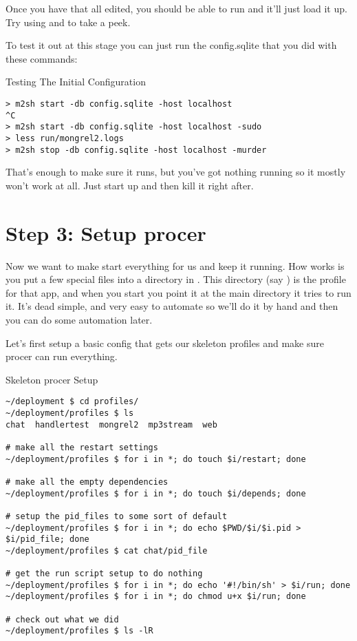 Once you have that all edited, you should be able to run  and it'll just load it up.  Try using
 and  to take a peek.


To test it out at this stage you can just run the config.sqlite that you
did with these commands:

\begin{code}{Testing The Initial Configuration}
\begin{Verbatim}
> m2sh start -db config.sqlite -host localhost
^C
> m2sh start -db config.sqlite -host localhost -sudo
> less run/mongrel2.logs
> m2sh stop -db config.sqlite -host localhost -murder
\end{Verbatim}
\end{code}

That's enough to make sure it runs, but you've got nothing running
so it mostly won't work at all.  Just start up and then kill it
right after.


\section{Step 3: Setup procer}

Now we want to make  start everything for us and keep
it running.  How  works is you put a few special
files into a directory in .  This directory (say )
is the profile for that app, and when you start  you
point it at the main  directory it tries to run it.
It's dead simple, and very easy to automate so we'll do it by hand
and then you can do some automation later.

Let's first setup a basic config that gets our skeleton profiles
and make sure procer can run everything.

\begin{code}{Skeleton procer Setup}
\begin{Verbatim}
~/deployment $ cd profiles/
~/deployment/profiles $ ls
chat  handlertest  mongrel2  mp3stream	web

# make all the restart settings
~/deployment/profiles $ for i in *; do touch $i/restart; done

# make all the empty dependencies
~/deployment/profiles $ for i in *; do touch $i/depends; done

# setup the pid_files to some sort of default
~/deployment/profiles $ for i in *; do echo $PWD/$i/$i.pid > $i/pid_file; done
~/deployment/profiles $ cat chat/pid_file 

# get the run script setup to do nothing
~/deployment/profiles $ for i in *; do echo '#!/bin/sh' > $i/run; done
~/deployment/profiles $ for i in *; do chmod u+x $i/run; done

# check out what we did
~/deployment/profiles $ ls -lR
\end{Verbatim}
\end{code}

